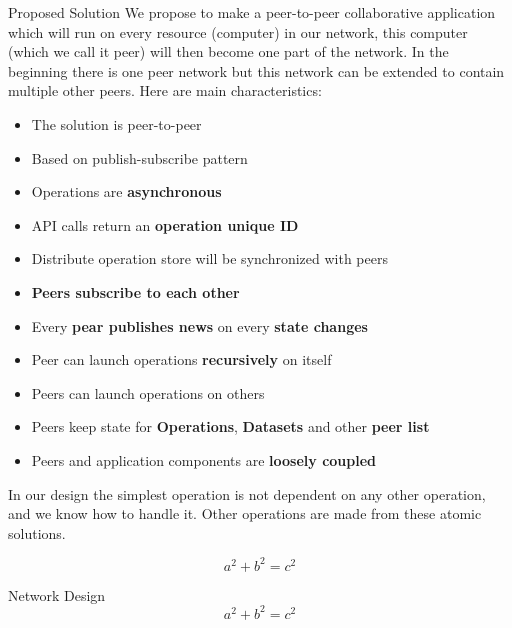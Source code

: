 \documentclass[final,hyperref={pdfpagelabels=true}]{beamer}
\begin{document}
\begin{frame}
\begin{columns}[t]
\begin{column}{.45\textwidth}
      \begin{block}{Proposed Solution}
      We propose to make a peer-to-peer collaborative application which will run on every resource (computer) in our network, this computer (which we call it peer) will then become one part of the network. In the beginning there is one peer network but this network can be extended to contain multiple other peers. Here are main characteristics:
      \begin{itemize}
      \item The solution is peer-to-peer
      \item Based on publish-subscribe pattern
      \item Operations are \textbf{asynchronous}
      \item API calls return an \textbf{operation unique ID}
      \item Distribute operation store will be synchronized with peers
      \item \textbf{Peers subscribe to each other}
      \item Every \textbf{pear publishes news} on every \textbf{state changes}
      \item Peer can launch operations \textbf{recursively} on itself
      \item Peers can launch operations on others
      \item Peers keep state for \textbf{Operations}, \textbf{Datasets} and other \textbf{peer list}
      \item Peers and application components are \textbf{loosely coupled}
      \end{itemize}
      
      In our design the simplest operation is not dependent on any other operation, and we know how to handle it. Other operations are made from these atomic solutions.
      
        \begin{equation}
          a^2+b^2=c^2
        \end{equation}
      \end{block}

      \begin{block}{Network Design}
        \begin{equation}
          a^2+b^2=c^2
        \end{equation}
      \end{block}


\end{column}
\end{columns}
\end{frame}
\end{document}
